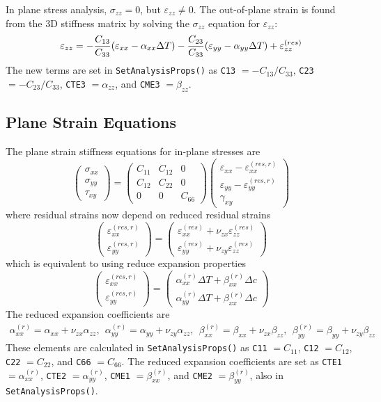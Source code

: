\documentclass[11pt]{article}
\def\a#1{\alpha_{#1}}
\def\b#1{\beta_{#1}}
\def\code#1{{\small\tt #1}}
\def\DT{\Delta T}
\def\e#1{\varepsilon_{#1}}
\def\er#1{\varepsilon_{#1}^{(res)}}
\def\err#1{\varepsilon_{#1}^{(res,r)}}
\def\g#1{\gamma_{#1}}
\def\s#1{\sigma_{#1}}
\def\t#1{\tau_{#1}}
\def\v#1{\nu_{#1}}
\def\vvec#1#2#3{\left(\begin{array}{ccc} #1 \\ #2 \\ #3 \end{array}\right)}
\def\symmat#1#2#3#4#5#6{\left(\begin{array}{ccc} #1 & #2 & #3 \\ #2 & #4 & #5 \\
                                                      #3 & #5 & #6 \end{array}\right)}
\begin{document}
In plane stress analysis, $\s{zz}=0$, but $\e{zz}\ne0$. The out-of-plane strain is found from the 3D stiffness matrix by solving the $\s{zz}$ equation for $\e{zz}$:
\begin{equation}
            \e{zz} = -{C_{13}\over C_{33}}(\e{xx} -\a{xx}\DT) - {C_{23}\over C_{33}}(\e{yy} -\a{yy}\DT) 
                     + \er{zz}
\end{equation}
The new terms are set in \code{SetAnalysisProps()} as \code{C13} $=-C_{13}/C_{33}$, \code{C23} $=-C_{23}/C_{33}$, \code{CTE3} $=\a{zz}$, and \code{CME3} $=\b{zz}$.

\subsection{Plane Strain Equations}

The plane strain stiffness equations for in-plane stresses are
\begin{equation}
      \vvec{\s{xx}}{\s{yy}}{\t{xy}} = \symmat{C_{11}}{C_{12}}{0}{C_{22}}{0}{C_{66}}
          \vvec{\e{xx} -\err{xx}}{\e{yy} - \err{yy}}{\g{xy}}
 \end{equation}
 where residual strains now depend on reduced residual strains
\begin{equation}
\left(\begin{array}{c} \err{xx} \\ \err{yy}  \end{array}\right)
       =  \left(\begin{array}{c}
	 \er{xx} + \v{zx}\er{zz} \\
	\er{yy} + \v{zy}\er{zz} \end{array}\right)
\end{equation}
which is equivalent to using reduce expansion properties
\begin{equation}
\left(\begin{array}{c} \err{xx} \\ \err{yy}  \end{array}\right)
       =  \left(\begin{array}{c}
	 \a{xx}^{(r)}\DT + \b{xx}^{(r)}\Delta c \\
	\a{yy}^{(r)}\DT + \b{xx}^{(r)}\Delta c \end{array}\right)
\end{equation}
The reduced expansion coefficients are
\begin{eqnarray}%
   \a{xx}^{(r)} = \a{xx} + \v{zx}\a{zz}, \ \ 
   \a{yy}^{(r)} = \a{yy} + \v{zy}\a{zz}, \ \ 
   \b{xx}^{(r)} = \b{xx} + \v{zx}\b{zz}, \ \ 
   \b{yy}^{(r)} = \b{yy} + \v{zy}\b{zz}
\end{eqnarray}%
These elements are calculated in \code{SetAnalysisProps()} as \code{C11} $=C_{11}$, \code{C12}  $=C_{12}$, \code{C22} $=C_{22}$, and \code{C66} $=C_{66}$. The reduced expansion coefficients are set as \code{CTE1} $=\a{xx}^{(r)}$, \code{CTE2} $=\a{yy}^{(r)}$, \code{CME1} $=\b{xx}^{(r)}$, and \code{CME2} $=\b{yy}^{(r)}$, also in \code{SetAnalysisProps()}.
\end{document}
